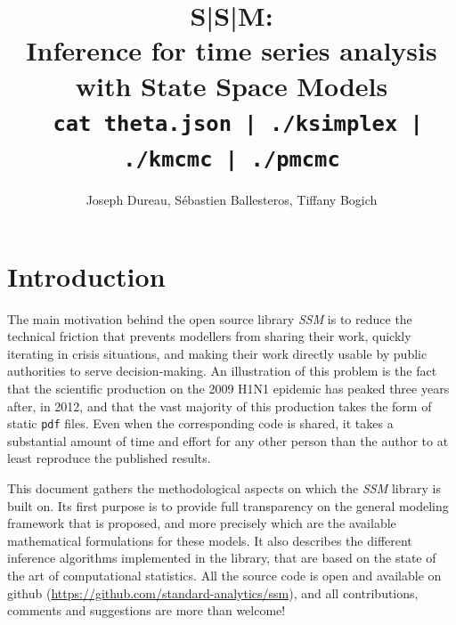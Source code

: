 \documentclass[a4paper,11pt,titlepage]{article}
\theoremstyle{plain} %
\begin{document}
\vspace{2 cm} 
\title{S|S|M:\\ Inference for time series analysis with State Space Models\\ \vspace{1 cm} {\large \texttt{ cat theta.json | ./ksimplex | ./kmcmc | ./pmcmc}}}


\author{Joseph Dureau, S\'ebastien Ballesteros, Tiffany Bogich}

\maketitle


\section{Introduction}

The main motivation behind the open source library \emph{SSM} is to reduce the technical friction that prevents modellers from sharing their work, quickly iterating in crisis situations, and making their work directly usable by public authorities to serve decision-making.
An illustration of this problem is the fact that the scientific production on the 2009 H1N1 epidemic has peaked three years after, in  2012, and that the vast majority of this production takes the form of static  \texttt{pdf} files. Even when the corresponding code is shared, it takes a substantial amount of time and effort for any other person than the author to at least reproduce the published results. 

This document gathers the methodological aspects on which the \emph{SSM} library is built on. Its first purpose is to provide full transparency on the general modeling framework that is proposed, and more precisely which are the available mathematical formulations for these models. It also describes the different inference algorithms implemented in the library, that are based on the state of the art of computational statistics.  All the source code is open and available on github (\href{https://github.com/standard-analytics/ssm}{https://github.com/standard-analytics/ssm}), and all contributions, comments and suggestions are more than welcome!
\end{document}
